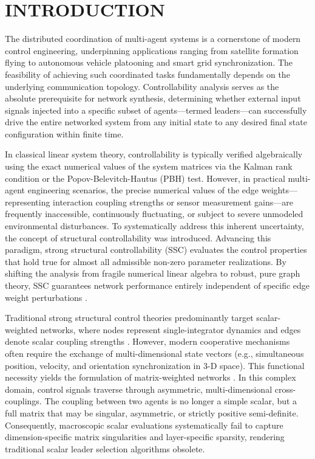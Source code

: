\documentclass{IEEEtran}
\begin{document}
	\section{INTRODUCTION}
	The distributed coordination of multi-agent systems is a cornerstone of modern control engineering, underpinning applications ranging from satellite formation flying to autonomous vehicle platooning and smart grid synchronization. The feasibility of achieving such coordinated tasks fundamentally depends on the underlying communication topology. Controllability analysis serves as the absolute prerequisite for network synthesis, determining whether external input signals injected into a specific subset of agents—termed leaders—can successfully drive the entire networked system from any initial state to any desired final state configuration within finite time.
	
	In classical linear system theory, controllability is typically verified algebraically using the exact numerical values of the system matrices via the Kalman rank condition or the Popov-Belevitch-Hautus (PBH) test. However, in practical multi-agent engineering scenarios, the precise numerical values of the edge weights—representing interaction coupling strengths or sensor measurement gains—are frequently inaccessible, continuously fluctuating, or subject to severe unmodeled environmental disturbances. To systematically address this inherent uncertainty, the concept of structural controllability was introduced. Advancing this paradigm, strong structural controllability (SSC) \cite{c1} evaluates the control properties that hold true for almost all admissible non-zero parameter realizations. By shifting the analysis from fragile numerical linear algebra to robust, pure graph theory, SSC guarantees network performance entirely independent of specific edge weight perturbations \cite{c2,c3,c4}.
	
	Traditional strong structural control theories predominantly target scalar-weighted networks, where nodes represent single-integrator dynamics and edges denote scalar coupling strengths \cite{c5,c6}. However, modern cooperative mechanisms often require the exchange of multi-dimensional state vectors (e.g., simultaneous position, velocity, and orientation synchronization in $3$-D space). This functional necessity yields the formulation of matrix-weighted networks \cite{c11,c12,c14}. In this complex domain, control signals traverse through asymmetric, multi-dimensional cross-couplings. The coupling between two agents is no longer a simple scalar, but a full matrix that may be singular, asymmetric, or strictly positive semi-definite. Consequently, macroscopic scalar evaluations systematically fail to capture dimension-specific matrix singularities and layer-specific sparsity, rendering traditional scalar leader selection algorithms obsolete.
	
\end{document}
